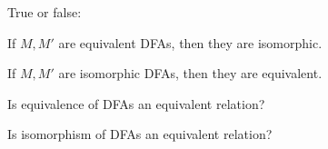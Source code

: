   \mbox{}
  \begin{tightlist}
  \item True or false:
    \begin{tightlist}
    \item If $M, M'$ are equivalent DFAs, then they are isomorphic.
    \item If $M, M'$ are isomorphic DFAs, then they are equivalent.
    \end{tightlist}
  \item Is equivalence of DFAs an equivalent relation?
  \item Is isomorphism of DFAs an equivalent relation?  
  \end{tightlist}
